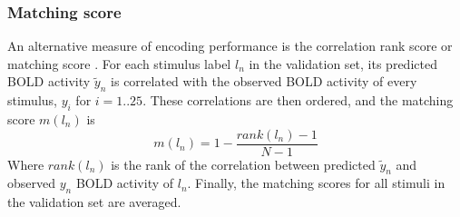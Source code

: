\subsubsection*{Matching score}
%
An alternative measure of encoding performance is the correlation rank score or
matching score \citep{SF14}. For each stimulus label $l_{n}$ in the validation
set, its predicted BOLD activity $\widetilde{y}_{n}$ is correlated with the
observed BOLD activity of every stimulus, $y_{i}$ for $i=1..25$. These
correlations are then ordered, and the  matching score $m(l_{n})$ is \[
m(l_{n}) = 1-\frac{rank(l_{n})-1}{N-1} \] Where $rank(l_{n})$ is the rank of
the correlation between predicted $\widetilde{y}_{n}$ and observed $y_{n}$ BOLD
activity of $l_{n}$. Finally, the matching scores for all stimuli in the
validation set are averaged.

